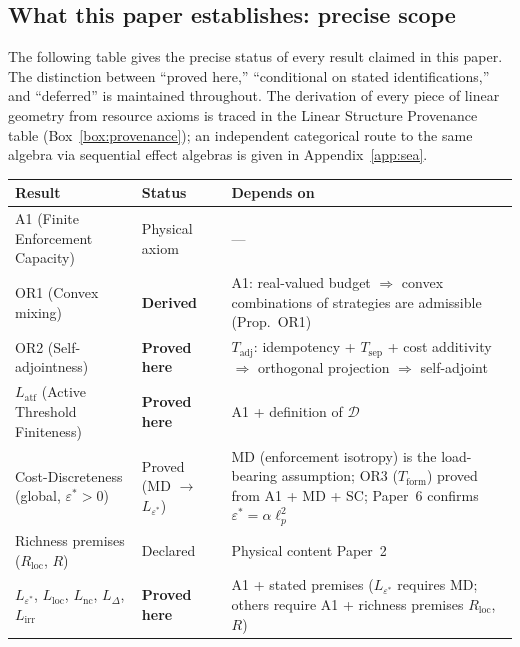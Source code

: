 \documentclass[11pt]{article}
\theoremstyle{remark}
\begin{document}
\subsection{What this paper establishes: precise scope}
\label{sec:precise_scope}

The following table gives the precise status of every result claimed in this
paper.  The distinction between ``proved here,'' ``conditional on stated
identifications,'' and ``deferred'' is maintained throughout.  The derivation of every piece of linear geometry from resource axioms is traced in the Linear Structure Provenance table (Box~\ref{box:provenance}); an independent categorical route to the same algebra via sequential effect algebras is given in Appendix~\ref{app:sea}.

\begin{center}
\small
{}
\smallskip
\begin{tabular}{p{5.0cm}p{2.8cm}p{4.8cm}}
\toprule
\textbf{Result} & \textbf{Status} & \textbf{Depends on} \\
\midrule
A1 (Finite Enforcement Capacity) & Physical axiom & --- \\
OR1 (Convex mixing) & \textbf{Derived} & A1: real-valued budget $\Rightarrow$ convex combinations of strategies are admissible (Prop.~OR1) \\
OR2 (Self-adjointness) & \textbf{Proved here} & $T_{\mathrm{adj}}$: idempotency + $T_{\mathrm{sep}}$ + cost additivity $\Rightarrow$ orthogonal projection $\Rightarrow$ self-adjoint \\
$L_{\mathrm{atf}}$ (Active Threshold Finiteness) & \textbf{Proved here} & A1 + definition of $\mathcal{D}$ \\
Cost-Discreteness (global, $\varepsilon^* > 0$) & Proved (MD $\to$ $L_{\varepsilon^*}$) & MD (enforcement isotropy) is the load-bearing assumption; OR3 ($T_{\mathrm{form}}$) proved from A1 + MD + SC; Paper~6 confirms $\varepsilon^* = \alpha\ell_p^2$ \\
Richness premises ($R_{\mathrm{loc}}$, $R$) & Declared & Physical content Paper~2 \\
\midrule
$L_{\varepsilon^*}$, $L_{\mathrm{loc}}$, $L_{\mathrm{nc}}$,
$L_\Delta$, $L_{\mathrm{irr}}$ & \textbf{Proved here} & A1 + stated premises ($L_{\varepsilon^*}$ requires MD; others require A1 + richness premises $R_{\mathrm{loc}}$, $R$) \\

\end{tabular}
\end{center}
\end{document}
